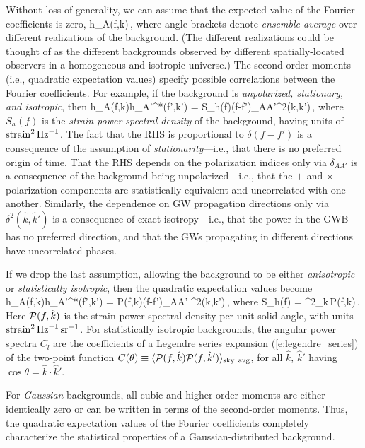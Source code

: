 Without loss of generality, we can assume that the 
expected value of the Fourier coefficients is 
zero,
%
\be
\langle h_A(f,\hat k)\,,
\ee
%
where angle brackets denote {\em ensemble average}
over different realizations of the background.
(The different realizations could be thought of 
as the different backgrounds observed by
different spatially-located observers in a homogeneous 
and isotropic universe.)
The second-order moments (i.e., quadratic expectation 
values) specify possible correlations between the 
Fourier coefficients.
For example, if the background is 
{\em unpolarized, stationary, and isotropic}, then
%
\be
\langle h_A(f,\hat k)h_{A'}^*(f',\hat k')\rangle
= S_h(f)\delta(f-f')\delta_{AA'}\delta^2(\hat k,\hat k')\,,
\label{e:quad_iso}
\ee
%
where $S_h(f)$ is the {\em strain power spectral 
density} of the background, 
having units of ${\rm strain}^2\,{\rm Hz}^{-1}$.
The fact that the RHS is proportional 
to $\delta(f-f')$ is a consequence of the assumption
of {\em stationarity}---i.e., that there is no 
preferred origin of time.
That the RHS depends on the polarization indices
only via  $\delta_{AA'}$ is a consequence of the 
background being unpolarized---i.e., that the 
$+$ and $\times$ polarization components are statistically
equivalent and uncorrelated with one another.
Similarly, the dependence on GW propagation directions 
only via $\delta^2(\hat k,\hat k')$ is a consequence of 
exact isotropy---i.e., that the power in the GWB has no preferred
direction, and that the GWs propagating in
different directions have uncorrelated phases.

If we drop the last assumption, allowing the background
to be either {\em anisotropic} or {\em statistically 
isotropic}, then the quadratic expectation values become
%
\be
\langle h_A(f,\hat k)h_{A'}^*(f',\hat k')\rangle
= {\cal P}(f,\hat k)\delta(f-f')\delta_{AA'}
\delta^2(\hat k,\hat k')\,,
\label{e:quad_aniso}
\ee
%
where
%
\be
S_h(f) = \int \D^2\Omega_{\hat k}\,{\cal P}(f,\hat k)\,.
\label{e:Sh_aniso}
\ee
%
Here ${\cal P}(f,\hat k)$ is the strain power
spectral density per unit solid angle, with 
units ${\rm strain}^2\,{\rm Hz}^{-1}\,{\rm sr}^{-1}$.
For statistically isotropic backgrounds, the angular power 
spectra $C_l$ are the coefficients of a Legendre 
series expansion (\ref{e:legendre_series})
of the two-point function 
$C(\theta)\equiv 
\langle {\cal P}(f,\hat k){\cal P}(f,\hat k')\rangle_{\rm sky\ avg}$, 
for all $\hat k$, $\hat k'$ having 
$\cos\theta = \hat k\cdot \hat k'$.

For {\em Gaussian} backgrounds, all cubic 
and higher-order moments are either identically zero 
or can be written in terms of the second-order moments.
Thus, the quadratic expectation values of the Fourier
coefficients completely characterize the statistical
properties of a Gaussian-distributed background.

